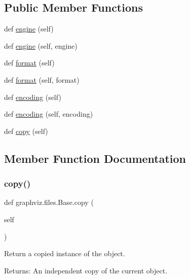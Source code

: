\subsection*{Public Member Functions}
\begin{DoxyCompactItemize}
\item 
def \hyperlink{classgraphviz_1_1files_1_1Base_a57460801144f9d27cca7c3e31067dbca}{engine} (self)
\item 
def \hyperlink{classgraphviz_1_1files_1_1Base_acb45da0b9b52d0a8cbb7b93fc52e1a0e}{engine} (self, engine)
\item 
def \hyperlink{classgraphviz_1_1files_1_1Base_a589f729bbe5a2aa199cc2627e45b493c}{format} (self)
\item 
def \hyperlink{classgraphviz_1_1files_1_1Base_a35fddb8525bd66f653124718472f6dbd}{format} (self, format)
\item 
def \hyperlink{classgraphviz_1_1files_1_1Base_a729e866b68657502b1fdc886732fbf92}{encoding} (self)
\item 
def \hyperlink{classgraphviz_1_1files_1_1Base_a21aaf8c3e477920671638b67302a3449}{encoding} (self, encoding)
\item 
def \hyperlink{classgraphviz_1_1files_1_1Base_a452de8b6a6ca8b03602bba21559f5031}{copy} (self)
\end{DoxyCompactItemize}


\subsection{Member Function Documentation}
\mbox{\label{classgraphviz_1_1files_1_1Base_a452de8b6a6ca8b03602bba21559f5031}} 
\subsubsection{\texorpdfstring{copy()}{copy()}}
{\footnotesize\ttfamily def graphviz.\+files.\+Base.\+copy (\begin{DoxyParamCaption}\item[{}]{self }\end{DoxyParamCaption})}

\begin{DoxyVerb}Return a copied instance of the object.

Returns:
    An independent copy of the current object.
\end{DoxyVerb}
 \mbox{\label{classgraphviz_1_1files_1_1Base_a729e866b68657502b1fdc886732fbf92}} 
